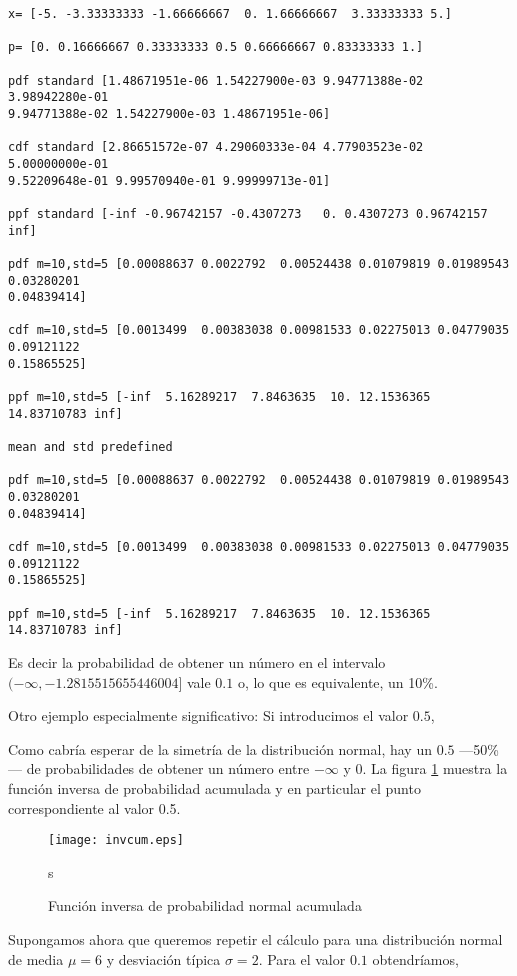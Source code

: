 \begin{verbatim}
x= [-5. -3.33333333 -1.66666667  0. 1.66666667  3.33333333 5.] 

p= [0. 0.16666667 0.33333333 0.5 0.66666667 0.83333333 1.]
 
pdf standard [1.48671951e-06 1.54227900e-03 9.94771388e-02 3.98942280e-01
9.94771388e-02 1.54227900e-03 1.48671951e-06] 

cdf standard [2.86651572e-07 4.29060333e-04 4.77903523e-02 5.00000000e-01
9.52209648e-01 9.99570940e-01 9.99999713e-01] 

ppf standard [-inf -0.96742157 -0.4307273   0. 0.4307273 0.96742157 inf] 

pdf m=10,std=5 [0.00088637 0.0022792  0.00524438 0.01079819 0.01989543 0.03280201 
0.04839414] 

cdf m=10,std=5 [0.0013499  0.00383038 0.00981533 0.02275013 0.04779035 0.09121122 
0.15865525] 

ppf m=10,std=5 [-inf  5.16289217  7.8463635  10. 12.1536365  14.83710783 inf] 

mean and std predefined 

pdf m=10,std=5 [0.00088637 0.0022792  0.00524438 0.01079819 0.01989543 0.03280201 
0.04839414] 

cdf m=10,std=5 [0.0013499  0.00383038 0.00981533 0.02275013 0.04779035 0.09121122
0.15865525] 

ppf m=10,std=5 [-inf  5.16289217  7.8463635  10. 12.1536365  14.83710783 inf] 
\end{verbatim}


Es decir la probabilidad de obtener un número en el intervalo $(-\infty, -1.2815515655446004]$ vale $0.1$ o, lo que es equivalente, un 10\%.

Otro ejemplo especialmente significativo: Si introducimos el valor $0.5$, 

Como cabría esperar de la simetría de la distribución normal, hay un $0.5$ ---50\%--- de probabilidades de obtener un número entre $-\infty$ y $0$.  La figura \ref{fig:invcum} muestra la función inversa de probabilidad acumulada y en particular el punto  correspondiente al valor 0.5.

\begin{figure}[h]
\centering
\texttt{[image: invcum.eps]}
\caption{Función inversa  de probabilidad normal acumulada}
\label{fig:invcum}s
\end{figure}

Supongamos ahora que queremos repetir el cálculo para una distribución normal de media $\mu=6$ y desviación típica $\sigma = 2$. Para el valor $0.1$ obtendríamos,


